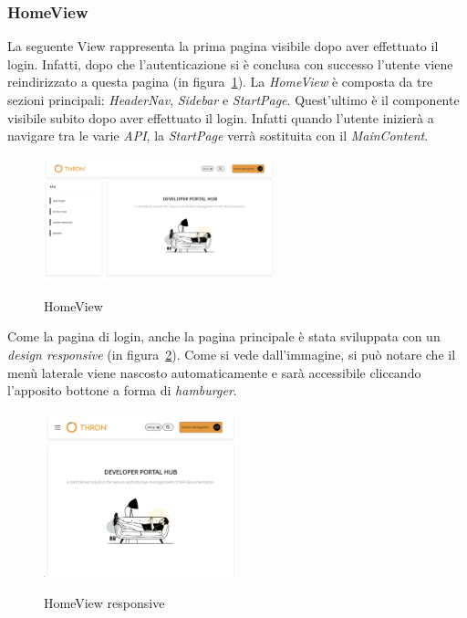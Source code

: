 \subsubsection{HomeView}\label{subsubsec:home-view}
La seguente View rappresenta la prima pagina visibile dopo aver effettuato il login. Infatti, dopo che l'autenticazione si è conclusa con successo
l'utente viene reindirizzato a questa pagina (in figura~\ref{fig:home-view}).
La \textit{HomeView} è composta da tre sezioni principali: \textit{HeaderNav}, \textit{Sidebar} e \textit{StartPage}. Quest'ultimo è il componente visibile 
subito dopo aver effettuato il login. Infatti quando l'utente inizierà a navigare tra le varie \textit{API}, la \textit{StartPage} verrà sostituita con il \textit{MainContent}.

\begin{figure}[ht]
  \centering
  \includegraphics[width=0.6\textwidth, alt={Pagina principale dell'applicazione}]{images/frontend/HomeView.jpg}
  \caption{HomeView}\label{fig:home-view}
\end{figure}

Come la pagina di login, anche la pagina principale è stata sviluppata con un \textit{design responsive} (in figura~\ref{fig:home-view-responsive}).
Come si vede dall'immagine, si può notare che il menù laterale viene nascosto automaticamente e sarà accessibile cliccando l'apposito bottone a forma di \textit{hamburger}.

\begin{figure}[ht]
  \centering
  \includegraphics[width=0.5\textwidth, alt={Pagina principale responsive dell'applicazione}]{images/frontend/HomeViewRes.jpg}
  \caption{HomeView responsive}\label{fig:home-view-responsive}
\end{figure}


